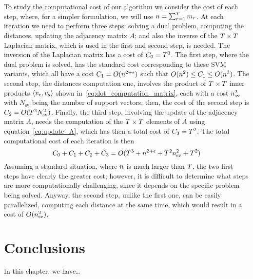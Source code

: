 To study the computational cost of our algorithm we consider the cost of each step, where, for a simpler formulation, we will use $n = \sum_{r=1}^T m_r$.
At each iteration we need to perform three steps: solving a dual problem, computing the distances, updating the adjacency matrix $A$; and also the inverse of the $T \times T$ Laplacian matrix, which is used in the first and second step, is needed. The inversion of the Laplacian matrix has a cost of $C_0 = T^3$.
The first step, where the dual problem is solved, has the standard cost corresponding to these SVM variants, which all have a cost $C_1 = O(n^{2+\epsilon})$ such that $O(n^2) \leq C_1 \leq O(n^3)$.
The second step, the distances computation one, involves the product of $T \times T$ inner products $\left\langle v_r, v_s \right\rangle$ shown in~\eqref{eq:dot_computation_matrix}, each with a cost $n_{\text{sv}}^2$ with $N_{\text{sv}}$ being the number of support vectors; then, the cost of the second step is $C_2 = O(T^2 N_\text{sv}^2)$. Finally, the third step, involving the update of the adjacency matrix $A$, needs the computation of the $T \times T$ elements of $A$ using equation~\eqref{eq:update_A}, which has then a total cost of $C_3 = T^2$.
The total computational cost of each iteration is then
$$ C_0 + C_1 + C_2 + C_3 = O(T^3 + n^{2+\epsilon} + T^2 n_\text{sv}^2 + T^2)$$
Assuming a standard situation, where $n$ is much larger than $T$, the two first steps have clearly the greater cost; however, it is difficult to determine what steps are more computationally challenging, since it depends on the specific problem being solved. Anyway, the second step, unlike the first one, can be easily parallelized, computing each distance at the same time, which would result in a cost of $O(n_\text{sv}^2)$. 




\section{Conclusions}\label{sec-conclusions-4}

In this chapter, we have\dots
